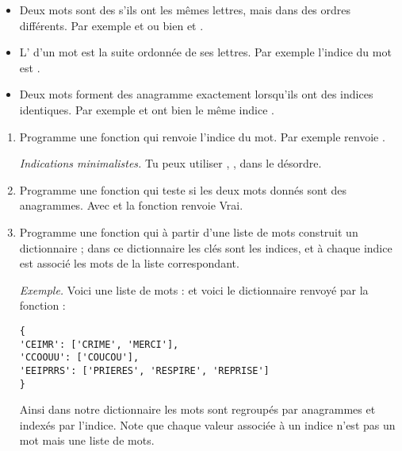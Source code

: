 \documentclass[11pt,class=report,crop=false]{standalone}
\begin{document}
\begin{activite}[Anagrammes]
   
 
 
\begin{itemize}
  \item Deux mots sont des  s'ils ont les mêmes lettres, mais dans des ordres différents. Par exemple  et  ou bien   et .

  \item L' d'un mot est la suite ordonnée de ses lettres. Par exemple l'indice du mot  est .
  
  \item Deux mots forment des anagramme exactement lorsqu'ils ont des indices identiques. Par exemple   et  ont bien le même indice .
\end{itemize}




\begin{enumerate}
  \item Programme une fonction  qui renvoie l'indice du mot.
  Par exemple  renvoie .
  
  \emph{Indications minimalistes.} Tu peux utiliser , ,  dans le désordre.
  
  \item Programme une fonction  qui teste si les deux mots donnés sont des anagrammes. Avec  et  la fonction renvoie \og{}Vrai\fg{}.
  
  \item Programme une fonction  qui à partir d'une liste de mots construit un dictionnaire ; dans ce dictionnaire les clés sont les indices, et à chaque indice
  est associé les mots de la liste correspondant.
  
  \emph{Exemple.} Voici une liste de mots :
  et voici le dictionnaire renvoyé par la fonction :
\begin{lstlisting}
{
'CEIMR': ['CRIME', 'MERCI'], 
'CCOOUU': ['COUCOU'], 
'EEIPRRS': ['PRIERES', 'RESPIRE', 'REPRISE']
}
\end{lstlisting}
  Ainsi dans notre dictionnaire les mots sont regroupés par anagrammes et indexés par l'indice.
  Note que chaque valeur associée à un indice n'est pas un mot mais une liste de mots.
  

\end{enumerate}
\end{activite}
\end{document}
